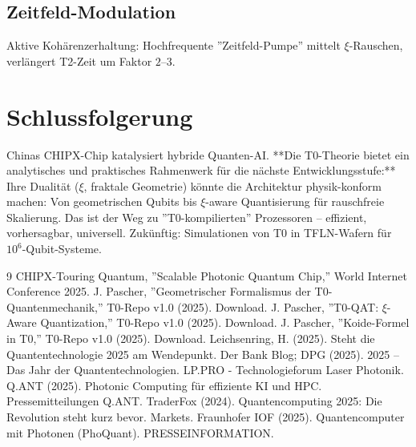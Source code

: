 	\subsection{Zeitfeld-Modulation}
	Aktive Kohärenzerhaltung: Hochfrequente ''Zeitfeld-Pumpe'' mittelt $\xi$-Rauschen, verlängert T2-Zeit um Faktor $2$--$3$.
	\begin{table}[htbp]
		\centering
		\caption{Vorgeschlagene T0-Optimierungen für zukünftige photonische Quantenchips}
		\label{tab:optimizations}
	\end{table}
	
	\section{Schlussfolgerung}
	
	Chinas CHIPX-Chip katalysiert hybride Quanten-AI. **Die T0-Theorie bietet ein analytisches und praktisches Rahmenwerk für die nächste Entwicklungsstufe:** Ihre Dualität ($\xi$, fraktale Geometrie) könnte die Architektur physik-konform machen: Von geometrischen Qubits bis $\xi$-aware Quantisierung für rauschfreie Skalierung. Das ist der Weg zu ''T0-kompilierten'' Prozessoren – effizient, vorhersagbar, universell. Zukünftig: Simulationen von T0 in TFLN-Wafern für $10^6$-Qubit-Systeme.
	
	\begin{thebibliography}{9}
		 CHIPX-Touring Quantum, ''Scalable Photonic Quantum Chip,'' World Internet Conference 2025.
		 J. Pascher, ''Geometrischer Formalismus der T0-Quantenmechanik,'' T0-Repo v1.0 (2025). Download.
		 J. Pascher, ''T0-QAT: $\xi$-Aware Quantization,'' T0-Repo v1.0 (2025). Download.
		 J. Pascher, ''Koide-Formel in T0,'' T0-Repo v1.0 (2025). Download.
		 Leichsenring, H. (2025). Steht die Quantentechnologie 2025 am Wendepunkt. Der Bank Blog; DPG (2025). 2025 – Das Jahr der Quantentechnologien. LP.PRO - Technologieforum Laser Photonik.
		 Q.ANT (2025). Photonic Computing für effiziente KI und HPC. Pressemitteilungen Q.ANT.
		 TraderFox (2024). Quantencomputing 2025: Die Revolution steht kurz bevor. Markets.
		 Fraunhofer IOF (2025). Quantencomputer mit Photonen (PhoQuant). PRESSEINFORMATION.
	\end{thebibliography}
	